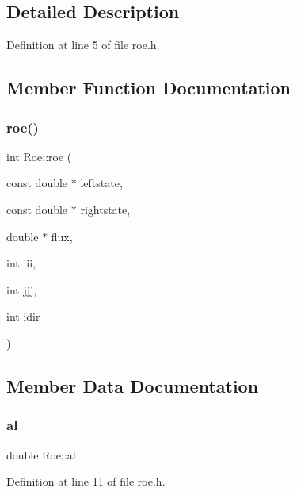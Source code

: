 \subsection{Detailed Description}


Definition at line 5 of file roe.\+h.



\subsection{Member Function Documentation}
\mbox{\label{classRoe_aabc9084b5c735d7bdfdc88f3c7cfdc87}} 
\subsubsection{\texorpdfstring{roe()}{roe()}}
{\footnotesize\ttfamily int Roe\+::roe (\begin{DoxyParamCaption}\item[{const double $\ast$}]{leftstate,  }\item[{const double $\ast$}]{rightstate,  }\item[{double $\ast$}]{flux,  }\item[{int}]{iii,  }\item[{int}]{jjj,  }\item[{int}]{idir }\end{DoxyParamCaption})}



\subsection{Member Data Documentation}
\mbox{\label{classRoe_a3fe943eae01a90270cf6045fc4dfdcdf}} 
\subsubsection{\texorpdfstring{al}{al}}
{\footnotesize\ttfamily double Roe\+::al\hspace{0.3cm}{\ttfamily [private]}}



Definition at line 11 of file roe.\+h.

\mbox{\label{classRoe_afcb0ba2c21329c19b0e463bb453b8ed9}} 
